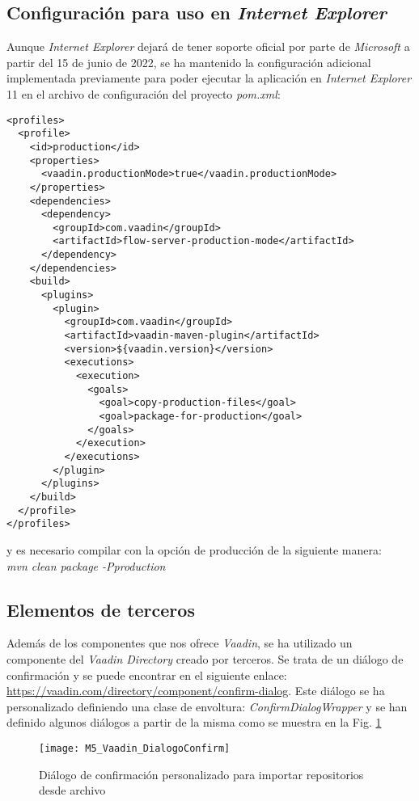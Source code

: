 \newpage
\subsection{Configuración para uso en \textit{Internet Explorer}}

Aunque \textit{Internet Explorer} dejará de tener soporte oficial por parte de \textit{Microsoft} a partir del 15 de junio de 2022, se ha mantenido la configuración adicional implementada previamente para poder ejecutar la aplicación en \textit{Internet Explorer} 11 en el archivo de configuración del proyecto \textit{pom.xml}:\\
\begin{minipage}{\linewidth}
{\tiny
\begin{verbatim}
<profiles>
  <profile>
    <id>production</id>
    <properties>
      <vaadin.productionMode>true</vaadin.productionMode>
    </properties>
    <dependencies>
      <dependency>
        <groupId>com.vaadin</groupId>
        <artifactId>flow-server-production-mode</artifactId>
      </dependency>
    </dependencies>
    <build>
      <plugins>
        <plugin>
          <groupId>com.vaadin</groupId>
          <artifactId>vaadin-maven-plugin</artifactId>
          <version>${vaadin.version}</version>
          <executions>
            <execution>
              <goals>
                <goal>copy-production-files</goal>
                <goal>package-for-production</goal>
              </goals>
            </execution>
          </executions>
        </plugin>
      </plugins>
    </build>
  </profile>
</profiles>
\end{verbatim}
}
\end{minipage}

y es necesario compilar con la opción de producción de la siguiente manera:\\

 \textit{mvn clean package -Pproduction}

\newpage
\subsection{Elementos de terceros}

Además de los componentes que nos ofrece \textit{Vaadin}, se ha utilizado un componente del \textit{Vaadin Directory} creado por terceros. Se trata de un diálogo de confirmación y se puede encontrar en el siguiente enlace: \url{https://vaadin.com/directory/component/confirm-dialog}. Este diálogo se ha personalizado definiendo una clase de envoltura: \textit{ConfirmDialogWrapper} y se han definido algunos diálogos a partir de la misma como se muestra en la Fig. \ref{fig:M5_DialogoConfirm}

\begin{figure}[!h]
	\centering
	\texttt{[image: M5\_Vaadin\_DialogoConfirm]}
	\caption{Diálogo de confirmación personalizado para importar repositorios desde archivo}\label{fig:M5_DialogoConfirm}
\end{figure}

